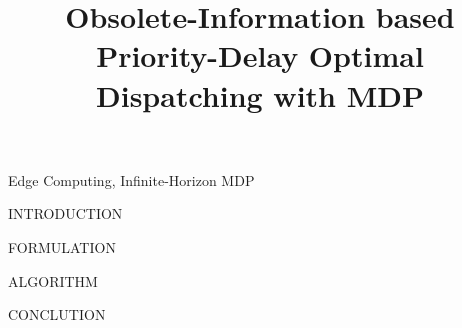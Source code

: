 \documentclass[10pt, conference, letterpaper]{IEEEtran}
\begin{document}
    \title{
        Obsolete-Information based Priority-Delay Optimal Dispatching with MDP
    }
    \author{
    }
    \maketitle

    \begin{abstract}
        \label{sec:abstract}
    \end{abstract}

    \begin{IEEEkeywords}
        Edge Computing, Infinite-Horizon MDP
    \end{IEEEkeywords}

    \begin{section}{INTRODUCTION}
        \label{sec:introduction}
        \cite{sutton1998introduction}
    \end{section}


    \begin{section}{FORMULATION}
        \label{sec:formulation}
    \end{section}

    \begin{section}{ALGORITHM}
        \label{sec:algorithm}
    \end{section}

    \begin{section}{CONCLUTION}
        \label{sec:conclusion}
    \end{section}

    
    
\end{document}
